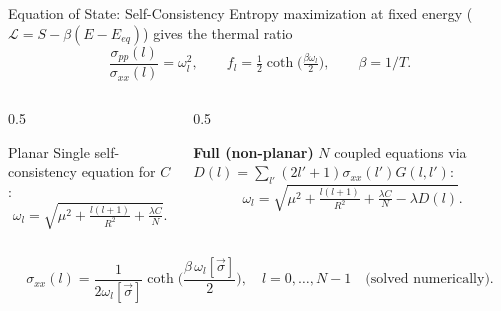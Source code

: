 \documentclass{beamer}
\newcommand{\new}[1]{{\color{metuaccent}\textbf{#1}}}
\begin{document}
\begin{frame}{Equation of State: Self-Consistency}
  Entropy maximization at fixed energy ($\mathcal{L}=S-\beta(E-E_{eq})$) gives the thermal ratio
  \begin{equation*}
    \frac{\sigma_{pp}(l)}{\sigma_{xx}(l)}=\omega_l^2,\qquad
    f_l=\tfrac{1}{2}\coth\!\big(\tfrac{\beta\omega_l}{2}\big),\qquad \beta=1/T.
  \end{equation*}
  \begin{columns}[T]
    \begin{column}{0.5\textwidth}
      \begin{block}{Planar}
        Single self-consistency equation for $C$:
        \begin{equation*}
          \omega_l=\sqrt{\mu^2+\tfrac{l(l+1)}{R^2}+\tfrac{\lambda C}{N}}.
        \end{equation*}
      \end{block}
    \end{column}
    \begin{column}{0.5\textwidth}
      \begin{block}{\new{Full (non-planar)}}
        $N$ coupled equations via $D(l)=\sum_{l'}(2l'+1)\sigma_{xx}(l')G(l,l')$:
        \begin{equation*}
          \omega_l=\sqrt{\mu^2+\tfrac{l(l+1)}{R^2}+\tfrac{\lambda C}{N}-\lambda D(l)}.
        \end{equation*}
      \end{block}
    \end{column}
  \end{columns}
  \vspace{0.4em}
  \begin{equation*}
    \sigma_{xx}(l)=\frac{1}{2\omega_l[\vec\sigma]}\coth\!\Big(\frac{\beta\,\omega_l[\vec\sigma]}{2}\Big),
    \quad l=0,\dots,N-1 \quad\text{(solved numerically).}
  \end{equation*}
\end{frame}
\end{document}
